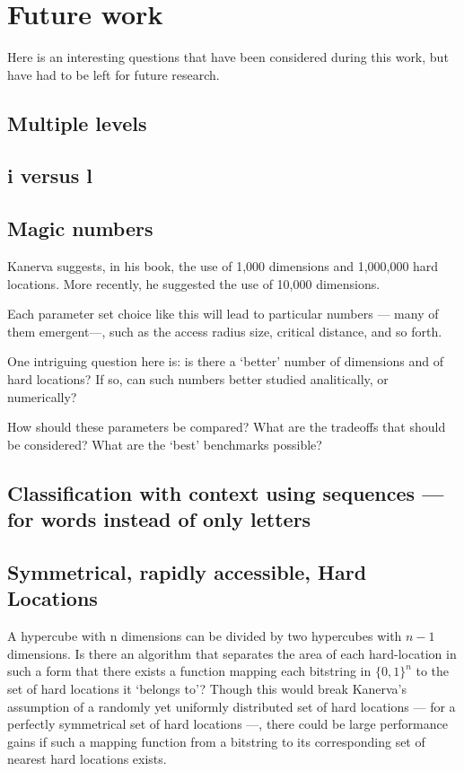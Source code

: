 \section{Future work}

Here is an interesting questions that have been considered during this work, but have had to be left for future research.

\subsection{Multiple levels}


\subsection{i versus l}


\subsection{Magic numbers}

Kanerva suggests, in his book, the use of 1,000 dimensions and 1,000,000 hard locations.  More recently, he suggested the use of 10,000 dimensions.

Each parameter set choice like this will lead to particular numbers --- many of them emergent---, such as the access radius size, critical distance, and so forth.

One intriguing question here is:  is there a `better' number of dimensions and of hard locations?  If so, can such numbers better studied analitically, or numerically?

How should these parameters be compared?  What are the tradeoffs that should be considered?  What are the `best' benchmarks possible?

\subsection{Classification with context using sequences --- for words instead of only letters}










\subsection{Symmetrical, rapidly accessible, Hard Locations}

A hypercube with n dimensions can be divided by two hypercubes with $n-1$ dimensions. Is there an algorithm that separates the area of each hard-location in such a form that there exists a function mapping each bitstring in $\{0,1\}^n$ to the set of hard locations it `belongs to'?  Though this would break Kanerva's assumption of a randomly yet uniformly distributed set of hard locations --- for a perfectly symmetrical set of hard locations ---, there could be large performance gains if such a mapping function from a bitstring to its corresponding set of nearest hard locations exists.

